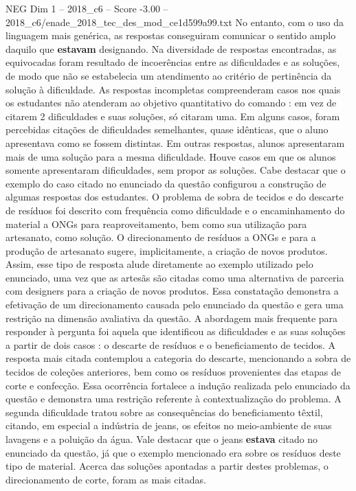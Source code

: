 \begin{textsample}{NEG Dim 1 – 2018\_c6 – Score -3.00 – 2018\_c6/enade\_2018\_tec\_des\_mod\_ce1d599a99.txt}
No entanto, com o uso da linguagem mais genérica, as respostas conseguiram comunicar o sentido amplo daquilo que \textbf{estavam} designando.
Na diversidade de respostas encontradas, as equivocadas foram resultado de incoerências entre as dificuldades e as soluções, de modo que não se estabelecia um atendimento ao critério de pertinência da solução à dificuldade.
As respostas incompletas compreenderam casos nos quais os estudantes não atenderam ao objetivo quantitativo do comando : em vez de citarem 2 dificuldades e suas soluções, só citaram uma.
Em alguns casos, foram percebidas citações de dificuldades semelhantes, quase idênticas, que o aluno apresentava como se fossem distintas.
Em outras respostas, alunos apresentaram mais de uma solução para a mesma dificuldade.
Houve casos em que os alunos somente apresentaram dificuldades, sem propor as soluções.
Cabe destacar que o exemplo do caso citado no enunciado da questão configurou a construção de algumas respostas dos estudantes.
O problema de sobra de tecidos e do descarte de resíduos foi descrito com frequência como dificuldade e o encaminhamento do material a ONGs para reaproveitamento, bem como sua utilização para artesanato, como solução.
O direcionamento de resíduos a ONGs e para a produção de artesanato sugere, implicitamente, a criação de novos produtos.
Assim, esse tipo de resposta alude diretamente ao exemplo utilizado pelo enunciado, uma vez que as artesãs são citadas como uma alternativa de parceria com designers para a criação de novos produtos.
Essa constatação demonstra a efetivação de um direcionamento causada pelo enunciado da questão e gera uma restrição na dimensão avaliativa da questão.
A abordagem mais frequente para responder à pergunta foi aquela que identificou as dificuldades e as suas soluções a partir de dois casos : o descarte de resíduos e o beneficiamento de tecidos.
A resposta mais citada contemplou a categoria do descarte, mencionando a sobra de tecidos de coleções anteriores, bem como os resíduos provenientes das etapas de corte e confecção.
Essa ocorrência fortalece a indução realizada pelo enunciado da questão e demonstra uma restrição referente à contextualização do problema.
A segunda dificuldade tratou sobre as consequências do beneficiamento têxtil, citando, em especial a indústria de jeans, os efeitos no meio-ambiente de suas lavagens e a poluição da água.
Vale destacar que o jeans \textbf{estava} citado no enunciado da questão, já que o exemplo mencionado era sobre os resíduos deste tipo de material.
Acerca das soluções apontadas a partir destes problemas, o direcionamento de corte, foram as mais citadas.

\end{textsample}
